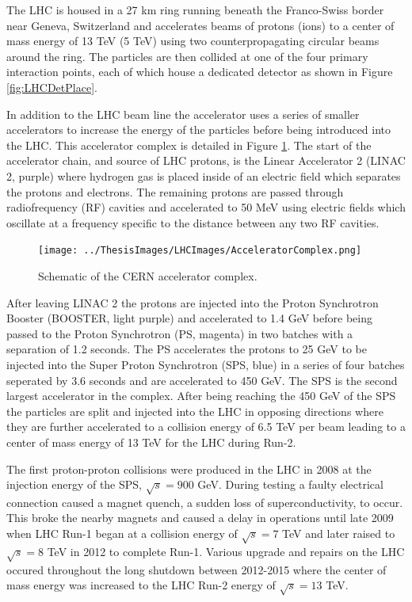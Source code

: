 The LHC is housed in a 27 km ring running beneath the Franco-Swiss border near Geneva, Switzerland and accelerates beams of protons (ions) to a center of mass energy of 13 TeV (5 TeV) using two counterpropagating circular beams around the ring.  The particles are then collided at one of the four primary interaction points, each of which house a dedicated detector as shown in Figure \ref{fig:LHCDetPlace}. 

In addition to the LHC beam line the accelerator uses a series of smaller accelerators to increase the energy of the particles before being introduced into the LHC.  This accelerator complex is detailed in Figure \ref{fig:AcceleratorMap}.  The start of the accelerator chain, and source of LHC protons, is the Linear Accelerator 2 (LINAC 2, purple) where hydrogen gas is placed inside of an electric field which separates the protons and electrons.  The remaining protons are passed through radiofrequency (RF) cavities and accelerated to 50 MeV using electric fields which oscillate at a frequency specific to the distance between any two RF cavities.
\begin{figure}[h!]
	\centering
	\texttt{[image: ../ThesisImages/LHCImages/AcceleratorComplex.png]}
	\caption[Schematic of the CERN accelerator complex.]{Schematic of the CERN accelerator complex.\cite{LHCAccComplex}
	}
	\label{fig:AcceleratorMap}
\end{figure}

After leaving LINAC 2 the protons are injected into the Proton Synchrotron Booster (BOOSTER, light purple) and accelerated to 1.4 GeV before being passed to the Proton Synchrotron (PS, magenta) in two batches with a separation of 1.2 seconds.  The PS accelerates the protons to 25 GeV to be injected into the Super Proton Synchrotron (SPS, blue) in a series of four batches seperated by 3.6 seconds and are accelerated to 450 GeV.  The SPS is the second largest accelerator in the complex.  After being reaching the 450 GeV of the SPS the particles are split and injected into the LHC in opposing directions where they are further accelerated to a collision energy of 6.5 TeV per beam leading to a center of mass energy of 13 TeV for the LHC during Run-2.

The first proton-proton collisions were produced in the LHC in 2008 at the injection energy of the SPS, $\sqrt{s} =900$ GeV.  During testing a faulty electrical connection caused a magnet quench, a sudden loss of superconductivity, to occur.  This broke the nearby magnets and caused a delay in operations until late 2009 when LHC Run-1 began at a collision energy of $\sqrt{s} = 7$ TeV and later raised to $\sqrt{s}=8$ TeV in 2012 to complete Run-1.  Various upgrade and repairs on the LHC occured throughout the long shutdown between 2012-2015 where the center of mass energy was increased to the LHC Run-2 energy of $\sqrt{s} = 13$ TeV.

